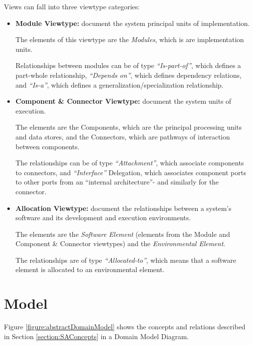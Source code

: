 Views can fall into three viewtype categories:
\begin{itemize}
\item \textbf{Module Viewtype:} document the system principal units of implementation. 

The elements of this viewtype are the \textit{Modules}, which is are implementation units. 

Relationships between modules can be of type \textit{``Is-part-of''}, which defines a part-whole relationship, \textit{``Depends on''}, which defines dependency relations, and \textit{``Is-a''}, which defines a generalization/specialization relationship.

\item \textbf{Component \& Connector Viewtype:} document the system units of execution. 

The elements are the Components, which are the principal processing units and data stores, and the Connectors, which are pathways of interaction between components. 

The relationships can be of type \textit{``Attachment''}, which associate components to connectors, and \textit{``Interface''} Delegation, which associates component ports to other ports from an ``internal architecture''- and similarly for the connector.

\item \textbf{Allocation Viewtype:} document the relationships between a system's software and its development and execution environments. 

The elements are the \textit{Software Element} (elements from the Module and Component \& Connector viewtypes) and the \textit{Environmental Element}. 

The relationships are of type \textit{``Allocated-to''}, which means that a software element is allocated to an environmental element. 
\end{itemize}

\section{Model}
\label{section:model}
Figure \ref{figure:abstractDomainModel} shows the concepts and relations described in Section \ref{section:SAConcepts} in a Domain Model Diagram.
 
